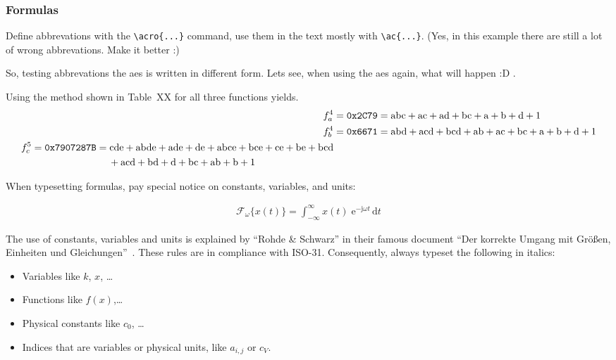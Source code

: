 \subsubsection{Formulas}

Define abbrevations with the \verb+\acro{...}+ command, use them in the text mostly with \verb+\ac{...}+. (Yes, in this example there are still a lot of wrong abbrevations. Make it better :)

So, testing abbrevations the \gls{aes} is written in different form. Lets see, when using the \gls{aes} again, what will happen :D .

Using the method shown in Table~XX for all three functions yields.
\begin{align}
f_a^4 &= \mathrm{\texttt{0x2C79}} = \mathrm{abc} + \mathrm{ac} + \mathrm{ad} + \mathrm{bc} + \mathrm{a} + \mathrm{b} + \mathrm{d} + \mathrm{1} \\
f_b^4 &= \mathrm{\texttt{0x6671}} = \mathrm{abd} + \mathrm{acd} + \mathrm{bcd} + \mathrm{ab} + \mathrm{ac} + \mathrm{bc} + \mathrm{a} + \mathrm{b} + \mathrm{d} + \mathrm{1}\\
\begin{split}
f_c^5 &= \mathrm{\texttt{0x7907287B}} = \mathrm{cde} + \mathrm{abde} + \mathrm{ade} + \mathrm{de} + \mathrm{abce} + \mathrm{bce} + \mathrm{ce} + \mathrm{be} + \mathrm{bcd}\\
&\hspace{2.75cm}+ \mathrm{acd} +\mathrm{bd} + \mathrm{d} + \mathrm{bc} + \mathrm{ab} + \mathrm{b} + \mathrm{1}
\end{split}
\end{align}

When typesetting formulas, pay special notice on constants, variables, and units:

 \begin{align}
  \mathcal{F}_{\omega}\{x(t)\} = \int^{\infty}_{-\infty} x(t) \;\mathrm{e}^{-\mathrm{j} \omega t}\,\mathrm{d}t
  \tag{Fourier-Transformation} %
  \end{align}
  
The use of constants, variables and units is explained by \enquote{Rohde \& Schwarz} in their famous document \enquote{Der korrekte Umgang mit Gr\"{o}\ss{}en, Einheiten und Gleichungen}~\cite{msc:correctuse}. These rules are in compliance with ISO-31. Consequently, always typeset the following in italics:

\begin{itemize}
\item Variables like $k$, $x$, \dots
\item Functions like $f(x)$,\dots
\item Physical constants like $c_0$, \dots
\item Indices that are variables or physical units, like $a_{i, j}$ or $c_V$.
\end{itemize}

